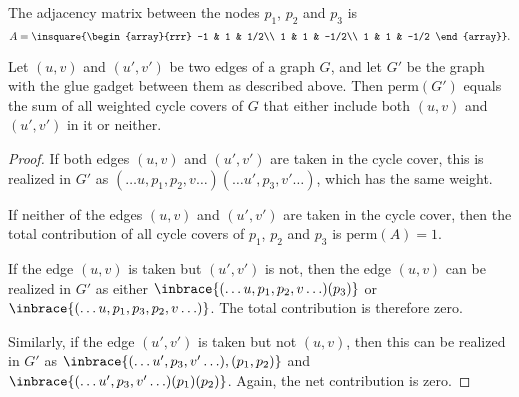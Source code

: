 \begin{center}
\end{center}
The adjacency matrix between the nodes $p_1$, $p_2$ and $p_3$ is 
\[
A = \insquare{\begin{array}{rrr}
-1 & 1 & 1/2\\
1 & 1 & -1/2\\
1 & 1 & -1/2
\end{array}}.
\]

\noindent
\begin{claim}
Let $(u,v)$ and $(u',v')$ be two edges of a graph $G$, and let $G'$ be the graph with the glue gadget between them as described above. 
Then $\mathrm{perm}(G')$ equals the sum of all weighted cycle covers of $G$ that either include both $(u,v)$ and $(u',v')$ in it or neither. 
\end{claim}
\begin{proof}
If both edges $(u,v)$ and $(u',v')$ are taken in the cycle cover, this is realized in $G'$ as ${(\ldots u,p_1, p_2, v \ldots) (\ldots u', p_3, v' \ldots)}$, which has the same weight.  

If neither of the edges $(u,v)$ and $(u',v')$ are taken in the cycle cover, then the total contribution of all cycle covers of $p_1$, $p_2$ and $p_3$ is $\mathrm{perm}(A) = 1$. 

If the edge $(u,v)$ is taken but $(u',v')$ is not, then the edge $(u,v)$ can be realized in $G'$ as either $\inbrace{(\ldots u,p_1,p_2,v \ldots) (p_3)}$ or $\inbrace{(\ldots u,p_1,p_3,p_2,v \ldots )}$. 
The total contribution is therefore zero. 

Similarly, if the edge $(u',v')$ is taken but not $(u,v)$, then this can be realized in $G'$ as $\inbrace{(\ldots u',p_3,v' \ldots),(p_1,p_2)}$ and $\inbrace{(\ldots u',p_3, v' \ldots) (p_1) (p_2)}$. 
Again, the net contribution is zero.  
\end{proof}


